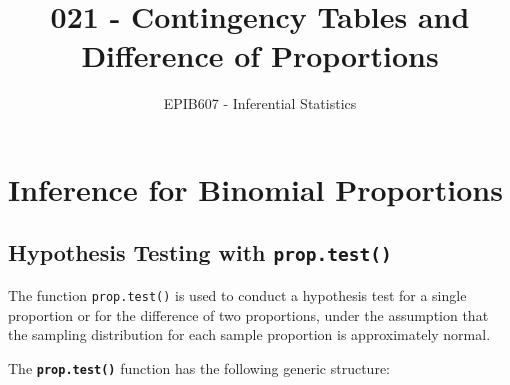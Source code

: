 \documentclass[letterpaper,12pt,twoside,]{pinp}
\title{021 - Contingency Tables and Difference of Proportions}
\author[a]{EPIB607 - Inferential Statistics}
\affil[a]{Fall 2020, McGill University}
\begin{document}
\verticaladjustment{-2pt}

\maketitle
\thispagestyle{firststyle}



\hypertarget{inference-for-binomial-proportions}{%
\section{Inference for Binomial
Proportions}\label{inference-for-binomial-proportions}}

\hypertarget{hypothesis-testing-with}{%
\subsection{\texorpdfstring{Hypothesis Testing with
\texttt{prop.test()}}{Hypothesis Testing with }}\label{hypothesis-testing-with}}

The function \texttt{prop.test()} is used to conduct a hypothesis test
for a single proportion or for the difference of two proportions, under
the assumption that the sampling distribution for each sample proportion
is approximately normal.

The \textbf{\texttt{prop.test()}} function has the following generic
structure:

\begin{Shaded}
\begin{Highlighting}[]
 \NormalTok{, } \NormalTok{, } \NormalTok{, } \NormalTok{)}
\end{Highlighting}
\end{Shaded}
\end{document}
